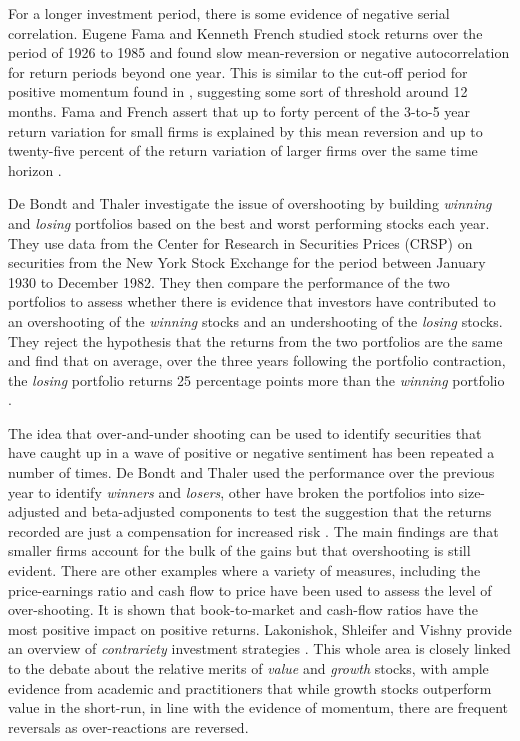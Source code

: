 \documentclass[12pt, a4paper, oneside]{article} %
\begin{document}
For a longer investment period, there is some evidence of negative serial correlation.  Eugene Fama and Kenneth French studied stock returns over the period of 1926 to 1985 and found slow mean-reversion or negative autocorrelation for return periods beyond one year.  This is similar to the cut-off period for positive momentum found in \citep{Jagadeesh}, suggesting some sort of threshold around 12 months.  Fama and French assert that up to forty percent of the 3-to-5 year return variation for small firms is explained by this mean reversion and up to twenty-five percent of the return variation of larger firms over the same time horizon \citep{FrenchFamaPermanent}. 

De Bondt and Thaler investigate the issue of overshooting by building \emph{winning} and \emph{losing} portfolios  based on the best and worst performing stocks each year.  They use data from the Center for Research in Securities Prices (CRSP) on securities from the New York Stock Exchange for the period between January 1930 to December 1982.  They then compare the performance of the two portfolios to assess whether there is evidence that investors have contributed to an overshooting of the \emph{winning} stocks and an undershooting of the \emph{losing} stocks.  They reject the hypothesis that the returns from the two portfolios are the same and find that on average, over the three years following the portfolio contraction, the \emph{losing} portfolio returns 25 percentage points more than the \emph{winning} portfolio \citep{DeBondtOver}.

The idea that over-and-under shooting can be used to identify securities that have caught up in a wave of positive or negative sentiment has been repeated a number of times.  De Bondt and Thaler used the performance over the previous year to identify \emph{winners} and \emph{losers}, other have broken the portfolios into size-adjusted and beta-adjusted components to test the suggestion that the returns recorded are just a compensation for increased risk  \citep{Chopra1992}.  The main findings are that smaller firms account for the bulk of the gains but that overshooting is still evident.  There are other examples where a variety of measures, including the price-earnings ratio \citep{BasuPE} and cash flow to price \citep{Chan1991} have been used to assess the level of over-shooting.  It is shown that book-to-market and cash-flow ratios have the most positive impact on positive returns.  Lakonishok, Shleifer and Vishny provide an overview of \emph{contrariety} investment strategies \citep{LakonishokContrarian}.  This whole area is closely linked to the debate about the relative merits of \emph{value} and \emph{growth} stocks, with ample evidence from academic and practitioners that while growth stocks outperform value in the short-run, in line with the evidence of momentum, there are frequent reversals as over-reactions are reversed.  
\end{document}
